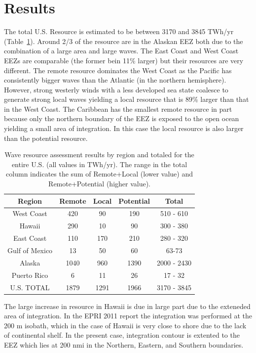 \section{Results}

The total U.S. Resource is estimated to be between 3170 and 3845 TWh/yr (Table~\ref{table:totals}). Around 2/3 of the resource are in the Alaskan EEZ both due to the combination of a large area and large waves. The East Coast and West Coast EEZs are comparable (the former bein 11\% larger) but their resources are very different. The remote resource dominates the West Coast as the Pacific has consistently bigger waves than the Atlantic (in the northern hemisphere). However, strong westerly winds with a less developed sea state coalesce to generate strong local waves yielding a local resource that is 89\% larger than that in the West Coast.  The Caribbean has the smallest remote resource in part because only the northern boundary of the EEZ is exposed to the open ocean yielding a small area of integration. In this case the local resource is also larger than the potential resource. 

\begin{table}[ht]
  \centering
  \begin{tabular}{|c|c|c|c|c|}
    \hline
    Region & Remote & Local & Potential & Total \\
    \hline
    West Coast & 420 & 90 & 190 & 510 - 610 \\
    Hawaii & 290 & 10 & 90 & 300 - 380 \\
    East Coast & 110 & 170 & 210 & 280 - 320 \\
    Gulf of Mexico & 13 & 50 & 60 & 63-73 \\
    Alaska & 1040 & 960 & 1390 & 2000 - 2430 \\
    Puerto Rico & 6 & 11 & 26 & 17 - 32 \\
    \hline \hline
U.S. TOTAL & 1879 & 1291 & 1966 & 3170 - 3845 \\
\hline
  \end{tabular}
  \caption{Wave resource assessment results by region and totaled for the entire U.S. (all values in TWh/yr). The range in the total column indicates the sum of Remote+Local (lower value) and Remote+Potential (higher value). }
  \label{table:totals}
\end{table}

The large increase in resource in Hawaii is due in large part due to the exteneded area of integration. In the EPRI 2011 report the integration was performed at the 200 m isobath, which in the case of Hawaii is very close to shore due to the lack of continental shelf. In the present case, integration contour is extented to the EEZ which lies at 200 nmi in the Northern, Eastern, and Southern boundaries.

